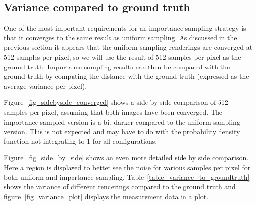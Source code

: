 \documentclass[11pt,a4paper]{report}
\begin{document}
\subsection{Variance compared to ground truth}

One of the most important requirements for an importance sampling strategy is that it converges to the same result as uniform sampling. As discussed in the previous section it appears that the uniform sampling renderings are converged at 512 samples per pixel, so we will use the result of 512 samples per pixel as the ground truth. Importance sampling results can then be compared with the ground truth by computing the distance with the ground truth (expressed as the average variance per pixel).

Figure~\ref{fig_sidebyside_converged} shows a side by side comparison of 512 samples per pixel, assuming that both images have been converged. The importance sampled version is a bit darker compared to the uniform sampling version. This is not expected and may have to do with the probability density function not integrating to 1 for all configurations.

Figure~\ref{fig_side_by_side} shows an even more detailed side by side comparison. Here a region is displayed to better see the noise for various samples per pixel for both uniform and importance sampling. Table~\ref{table_variance_to_groundtruth} shows the variance of different renderings compared to the ground truth and figure~\ref{fig_variance_plot} displays the measurement data in a plot.
\end{document}
